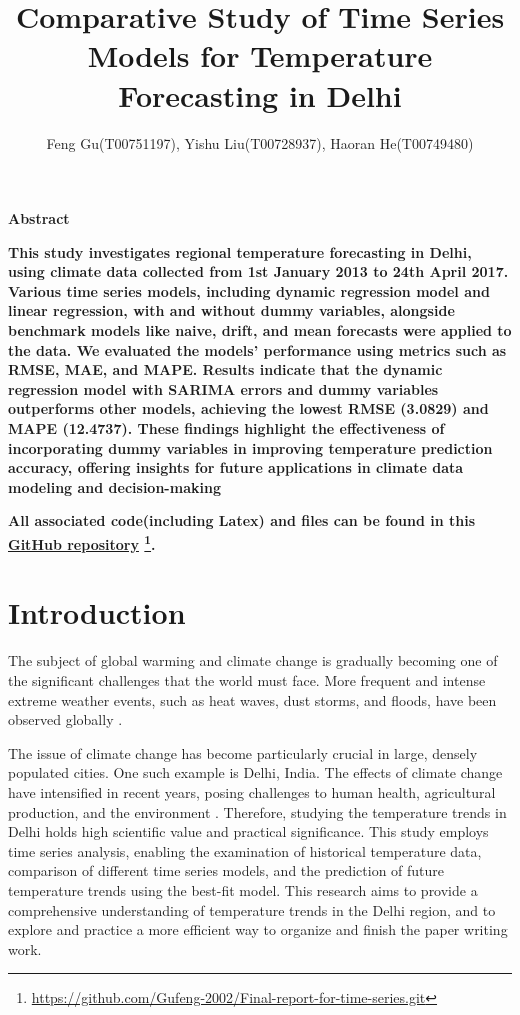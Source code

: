 \documentclass[12pt]{article}
\title{Comparative Study of Time Series Models for Temperature Forecasting in Delhi}
\author{Feng Gu(T00751197), Yishu Liu(T00728937), Haoran He(T00749480)}
\begin{document}
\maketitle

\begin{center}
    \textbf{\large Abstract}
\end{center}

\sloppy
\textbf{
This study investigates regional temperature forecasting in Delhi, using climate data collected 
from 1st January 2013 to 24th April 2017. Various time series models, including dynamic regression 
model and linear regression, with and without dummy variables, alongside benchmark models like naive,
 drift, and mean forecasts were applied to the data. We evaluated the models’ performance using 
 metrics such as RMSE, MAE, and MAPE. Results indicate that the dynamic regression model with 
 SARIMA errors and dummy variables outperforms other models, achieving the lowest RMSE (3.0829)
and MAPE (12.4737). These findings highlight the effectiveness of incorporating dummy variables 
in improving temperature prediction accuracy, offering insights for future applications in climate
data modeling and decision-making}

\textbf{
All associated code(including Latex) and files can be found in this \href{https://github.com/Gufeng-2002/Final-report-for-time-series.git}{GitHub repository}
\footnote{\href{https://github.com/Gufeng-2002/Final-report-for-time-series.git}{https://github.com/Gufeng-2002/Final-report-for-time-series.git}
}.
}




\section{Introduction}
\sloppy
The subject of global warming and climate change is gradually becoming one of the significant challenges 
that the world must face. More frequent and intense extreme weather events, such as heat waves, dust storms, 
and floods, have been observed globally \cite{dabhade2021}. 

The issue of climate change has become particularly crucial in large, densely populated cities. 
One such example is Delhi, India. The effects of climate change have intensified in recent years, 
posing challenges to human health, agricultural production, and the environment 
\cite{hussain2024}. 
Therefore, studying the temperature trends in Delhi holds high scientific value and practical significance. 
\sloppy
This study employs time series analysis, enabling the examination of historical temperature data,
comparison of different time series models, and the prediction of future temperature trends using the 
best-fit model. This research aims to provide a comprehensive understanding of temperature trends in the Delhi region,
and to explore and practice a more efficient way to organize and finish the paper writing work.
\end{document}
